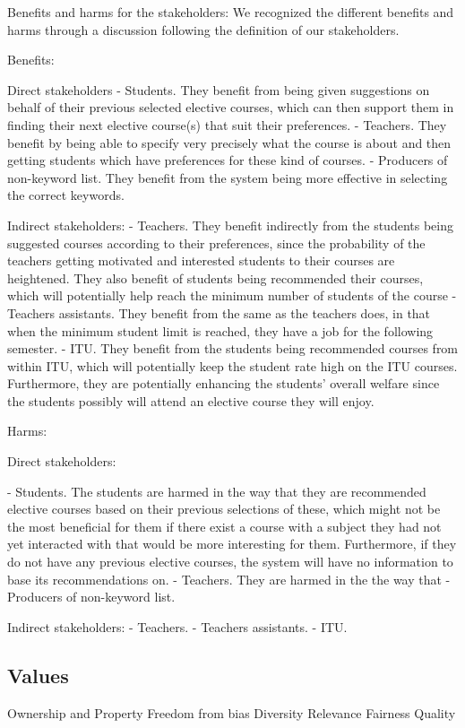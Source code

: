 Benefits and harms for the stakeholders:
We recognized the different benefits and harms through a discussion following the definition of our stakeholders.

Benefits:

Direct stakeholders
- Students. They benefit from being given suggestions on behalf of their previous selected elective courses, which can then support them in finding their next elective course(s) that suit their preferences.
- Teachers. They benefit by being able to specify very precisely what the course is about and then getting students which have preferences for these kind of courses.
- Producers of non-keyword list. They benefit from the system being more effective in selecting the correct keywords.

Indirect stakeholders:
- Teachers. They benefit indirectly from the students being suggested courses according to their preferences, since the probability of the teachers getting motivated and interested students to their courses are heightened. They also benefit of students being recommended their courses, which will potentially help reach the minimum number of students of the course
- Teachers assistants. They benefit from the same as the teachers does, in that when the minimum student limit is reached, they have a job for the following semester.
- ITU. They benefit from the students being recommended courses from within ITU, which will potentially keep the student rate high on the ITU courses. Furthermore, they are potentially enhancing the students' overall welfare since the students possibly will attend an elective course they will enjoy.


Harms:

Direct stakeholders:

- Students. The students are harmed in the way that they are recommended elective courses based on their previous selections of these, which might not be the most beneficial for them if there exist a course with a subject they had not yet interacted with that would be more interesting for them.
Furthermore, if they do not have any previous elective courses, the system will have no information to base its recommendations on.
- Teachers. They are harmed in the the way that 
- Producers of non-keyword list. 

Indirect stakeholders:
- Teachers.
- Teachers assistants.
- ITU. 




\subsection{Values}

Ownership and Property
Freedom from bias
Diversity
Relevance
Fairness
Quality


